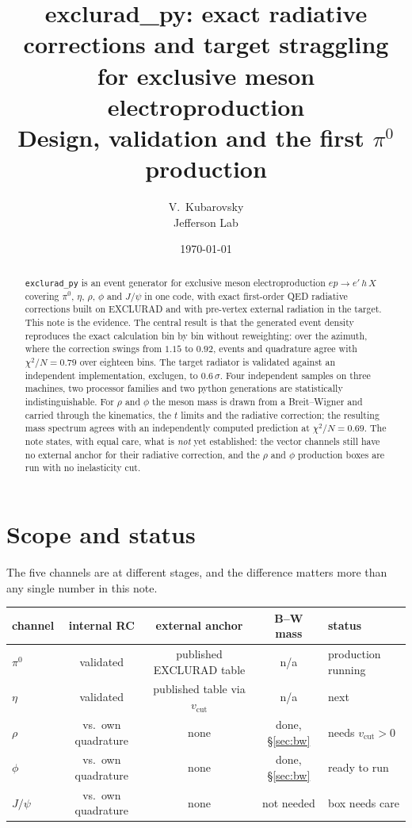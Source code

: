 \documentclass[11pt]{article}
\title{\textbf{exclurad\_py: exact radiative corrections and target
straggling for exclusive meson electroproduction}\\[2mm]
\large Design, validation and the first $\pi^0$ production}
\author{V.~Kubarovsky\\ \small Jefferson Lab}
\date{\today}
\newcommand{\vcut}{v_{\mathrm{cut}}}
\newcommand{\code}[1]{\texttt{#1}}
\begin{document}
\maketitle

\begin{abstract}
\code{exclurad\_py} is an event generator for exclusive meson
electroproduction $ep\to e'\,h\,X$ covering $\pi^0$, $\eta$, $\rho$, $\phi$
and $J/\psi$ in one code, with exact first-order QED radiative corrections
built on EXCLURAD and with pre-vertex external radiation in the target. This
note is the evidence. The central result is that the generated event density
reproduces the exact calculation bin by bin without reweighting: over the
azimuth, where the correction swings from $1.15$ to $0.92$, events and
quadrature agree with $\chi^2/N=0.79$ over eighteen bins. The target radiator
is validated against an independent implementation, exclugen, to
$0.6\,\sigma$. Four independent samples on three machines, two processor
families and two python generations are statistically indistinguishable. For
$\rho$ and $\phi$ the meson mass is drawn from a Breit--Wigner and carried
through the kinematics, the $t$ limits and the radiative correction; the
resulting mass spectrum agrees with an independently computed prediction at
$\chi^2/N=0.69$. The note states, with equal care, what is \emph{not} yet
established: the vector channels still have no external anchor for their
radiative correction, and the $\rho$ and $\phi$ production boxes are run
with no inelasticity cut.
\end{abstract}

\tableofcontents

\section{Scope and status}

The five channels are at different stages, and the difference matters more
than any single number in this note.

\begin{center}
\small
\begin{tabular}{lccc p{5.4cm}}
\toprule
channel & internal RC & external anchor & B--W mass & status \\
\midrule
$\pi^0$  & validated & published EXCLURAD table & n/a & production running \\
$\eta$   & validated & published table via $\vcut$ & n/a & next \\
$\rho$   & vs.\ own quadrature & none & done, §\ref{sec:bw} & needs $\vcut>0$ \\
$\phi$   & vs.\ own quadrature & none & done, §\ref{sec:bw} & ready to run \\
$J/\psi$ & vs.\ own quadrature & none & not needed & box needs care \\
\bottomrule
\end{tabular}
\end{center}
\end{document}
